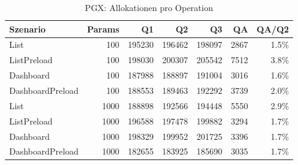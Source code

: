 \begin{table}[ht]
\centering
\caption{PGX: Allokationen pro Operation}
\begin{tabular}{lrrrrrr}
\toprule
Szenario & Params & Q1 & Q2 & Q3 & QA & QA/Q2 \\
\midrule
		List & 100 & 195230 & 196462 & 198097 & 2867 & 1.5\% \\
		ListPreload & 100 & 198030 & 200307 & 205542 & 7512 & 3.8\% \\
		Dashboard & 100 & 187988 & 188897 & 191004 & 3016 & 1.6\% \\
		DashboardPreload & 100 & 188553 & 189463 & 192292 & 3739 & 2.0\% \\
		List & 1000 & 188898 & 192566 & 194448 & 5550 & 2.9\% \\
		ListPreload & 1000 & 196588 & 197478 & 199882 & 3294 & 1.7\% \\
		Dashboard & 1000 & 198329 & 199952 & 201725 & 3396 & 1.7\% \\
		DashboardPreload & 1000 & 182655 & 183925 & 185690 & 3035 & 1.7\% \\
\bottomrule
\end{tabular}
\label{tab:benchmark_pgx_allocsperop}
\end{table}
	